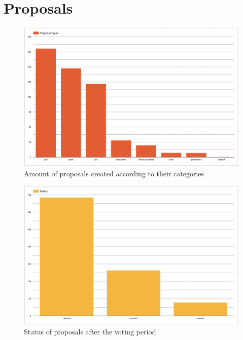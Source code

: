 \documentclass[MSE,Master,english]{twbook}%
\begin{document}
\section{Proposals}
\begin{figure}[H]
  \centering
  \includegraphics[width=\textwidth]{metrics/proposal_types.png}
  \caption{Amount of proposals created according to their categories}
  \label{fig:proposal_types}
\end{figure}

\begin{figure}[H]
  \centering
  \includegraphics[width=\textwidth]{metrics/proposal_status.png}
  \caption{Status of proposals after the voting period}
  \label{fig:proposal_status}
\end{figure}
\end{document}
